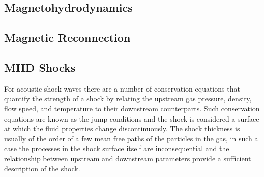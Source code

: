 \subsection{Magnetohydrodynamics}\label{sec:12}

\subsection{Magnetic Reconnection}\label{sec:13}

\subsection{MHD Shocks}\label{sec:14}

For acoustic shock waves there are a number of conservation equations that quantify the strength of a shock by relating the upstream gas pressure, density, flow speed, and temperature to their downstream counterparts. Such conservation equations are known as the jump conditions and the shock is considered a surface at which the fluid properties change discontinuously. The shock thickness is usually of the order of a few mean free paths of the particles in the gas, in such a case the processes in the shock surface itself are inconsequential and the relationship between upstream and downstream parameters provide a sufficient description of the shock. 

